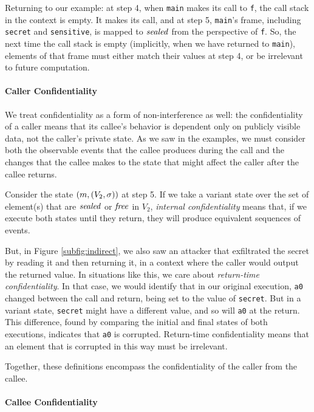 \documentclass[10pt,conference]{ieeetran}%
\theoremstyle{definition}
\begin{document}
Returning to our example: at step 4, when {\tt main} makes its call to {\tt f},
the call stack in the context is empty. It makes its call, and at step 5, {\tt main}'s
frame, including {\tt secret} and {\tt sensitive}, is mapped to \(\mathit{sealed}\) from the
perspective of {\tt f}. So, the next time the call stack is empty (implicitly, when
we have returned to {\tt main}), elements of that frame must either match their
values at step 4, or be irrelevant to future computation.

\paragraph*{Caller Confidentiality}

We treat confidentiality as a form of non-interference as well: the confidentiality of a caller
means that its callee's behavior is dependent only on publicly visible data,
not the caller's private state. As we saw in the examples, we must consider both the observable events
that the callee produces during the call and the changes that the callee makes to the state that might
affect the caller after the callee returns.

Consider the state \((m, (V_2,\sigma))\) at step 5. If we take a variant state over
the set of element(s) that are \(\mathit{sealed}\) or \(\mathit{free}\) in \(V_2\),
{\it internal confidentiality} means
that, if we execute both states until they return, they will produce equivalent sequences
of events.

But, in Figure \ref{subfig:indirect}, we also saw an attacker that exfiltrated the secret
by reading it and then returning it, in a context where the caller would output the returned
value. In situations like this, we care about {\it return-time confidentiality}.
In that case, we would identify that in our original execution, {\tt a0} changed between
the call and return, being set to the value of {\tt secret}. But in a variant state,
{\tt secret} might have a different value, and so will {\tt a0} at the return.
This difference, found by comparing the initial and final states of both executions,
indicates that {\tt a0} is corrupted. Return-time confidentiality means that
an element that is corrupted in this way must be irrelevant.

Together, these definitions encompass the confidentiality of the caller from the callee.

\paragraph*{Callee Confidentiality}
\end{document}
